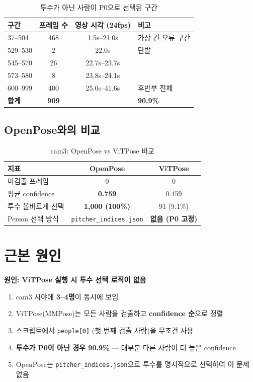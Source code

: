 \documentclass[11pt, a4paper]{article}
\begin{document}
\begin{table}[H]
\centering
\caption{투수가 아닌 사람이 P0으로 선택된 구간}
\renewcommand{\arraystretch}{1.3}
\begin{tabular}{lccl}
\toprule
\textbf{구간} & \textbf{프레임 수} & \textbf{영상 시각 (24fps)} & \textbf{비고} \\
\midrule
37--504 & 468 & 1.5s--21.0s & 가장 긴 오류 구간 \\
529--530 & 2 & 22.0s & 단발 \\
545--570 & 26 & 22.7s--23.7s & \\
573--580 & 8 & 23.8s--24.1s & \\
600--999 & 400 & 25.0s--41.6s & 후반부 전체 \\
\midrule
\textbf{합계} & \textbf{909} & & \textbf{90.9\%} \\
\bottomrule
\end{tabular}
\end{table}

\subsection{OpenPose와의 비교}

\begin{table}[H]
\centering
\caption{cam3: OpenPose vs ViTPose 비교}
\renewcommand{\arraystretch}{1.3}
\begin{tabular}{lcc}
\toprule
\textbf{지표} & \textbf{OpenPose} & \textbf{ViTPose} \\
\midrule
미검출 프레임 & 0 & 0 \\
평균 confidence & \textbf{0.759} & 0.459 \\
투수 올바르게 선택 & \textbf{1,000 (100\%)} & 91 (9.1\%) \\
Person 선택 방식 & \texttt{pitcher\_indices.json} & \textbf{없음 (P0 고정)} \\
\bottomrule
\end{tabular}
\end{table}


\section{근본 원인}

\begin{keyidea}
\textbf{원인: ViTPose 실행 시 투수 선택 로직이 없음}

\begin{enumerate}[nosep]
  \item cam3 시야에 \textbf{3--4명}이 동시에 보임
  \item ViTPose(MMPose)는 모든 사람을 검출하고 \textbf{confidence 순}으로 정렬
  \item 스크립트에서 \texttt{people[0]} (첫 번째 검출 사람)을 무조건 사용
  \item \textbf{투수가 P0이 아닌 경우 90.9\%} --- 대부분 다른 사람이 더 높은 confidence
  \item OpenPose는 \texttt{pitcher\_indices.json}으로 투수를 명시적으로 선택하여 이 문제 없음
\end{enumerate}
\end{keyidea}
\end{document}
